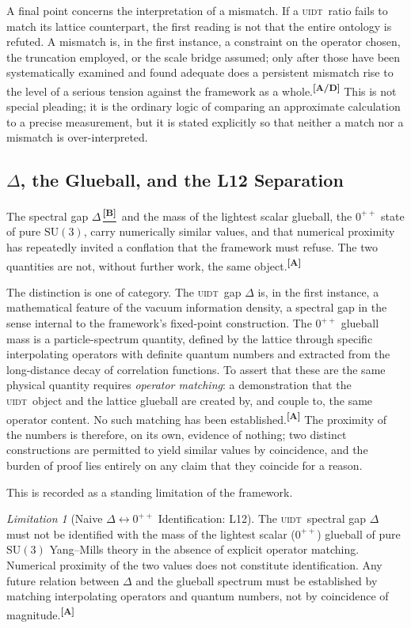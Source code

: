 \documentclass[12pt,a4paper,twoside]{article}
\theoremstyle{plain}
\theoremstyle{definition}
\theoremstyle{remark}
\newtheorem{limitation}[theorem]{Limitation}
\newcommand{\UIDT}{\textsc{uidt}}
\newcommand{\catmark}[1]{\textsuperscript{\textsf{\textbf{[#1]}}}}
\newcommand{\Bdelta}{\hyperref[box:pi-override-delta]{\catmark{B}}}
\begin{document}
A final point concerns the interpretation of a mismatch. If a \UIDT\ ratio fails to match its lattice counterpart, the first reading is not that the entire ontology is refuted. A mismatch is, in the first instance, a constraint on the operator chosen, the truncation employed, or the scale bridge assumed; only after those have been systematically examined and found adequate does a persistent mismatch rise to the level of a serious tension against the framework as a whole.\catmark{A/D} This is not special pleading; it is the ordinary logic of comparing an approximate calculation to a precise measurement, but it is stated explicitly so that neither a match nor a mismatch is over-interpreted.

\subsection{\texorpdfstring{$\Delta$}{Delta}, the Glueball, and the L12 Separation}
\label{subsec:delta-glueball-l12}

The spectral gap $\Delta$\,\Bdelta\ and the mass of the lightest scalar glueball, the $0^{++}$ state of pure $\mathrm{SU}(3)$, carry numerically similar values, and that numerical proximity has repeatedly invited a conflation that the framework must refuse. The two quantities are not, without further work, the same object.\catmark{A}

The distinction is one of category. The \UIDT\ gap $\Delta$ is, in the first instance, a mathematical feature of the vacuum information density, a spectral gap in the sense internal to the framework's fixed-point construction. The $0^{++}$ glueball mass is a particle-spectrum quantity, defined by the lattice through specific interpolating operators with definite quantum numbers and extracted from the long-distance decay of correlation functions. To assert that these are the same physical quantity requires \emph{operator matching}: a demonstration that the \UIDT\ object and the lattice glueball are created by, and couple to, the same operator content. No such matching has been established.\catmark{A} The proximity of the numbers is therefore, on its own, evidence of nothing; two distinct constructions are permitted to yield similar values by coincidence, and the burden of proof lies entirely on any claim that they coincide for a reason.

This is recorded as a standing limitation of the framework.

\begin{limitation}[Naive $\Delta\!\leftrightarrow\!0^{++}$ Identification: L12]
\label{lim:L12}
The \UIDT\ spectral gap $\Delta$ must not be identified with the mass of the lightest scalar ($0^{++}$) glueball of pure $\mathrm{SU}(3)$ Yang--Mills theory in the absence of explicit operator matching. Numerical proximity of the two values does not constitute identification. Any future relation between $\Delta$ and the glueball spectrum must be established by matching interpolating operators and quantum numbers, not by coincidence of magnitude.\catmark{A}
\end{limitation}
\end{document}
